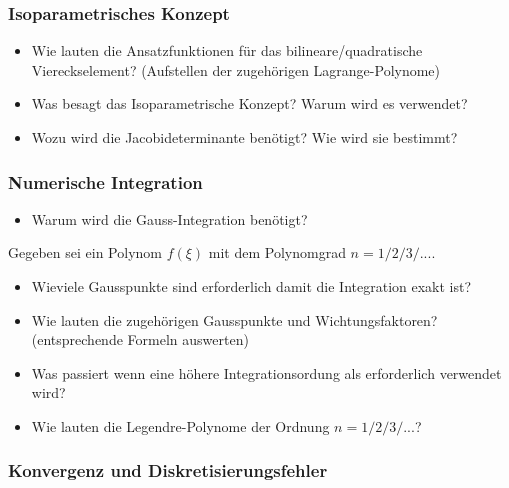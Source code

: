 \subsubsection*{Isoparametrisches Konzept}
\begin{itemize}
 \item Wie lauten die Ansatzfunktionen für das bilineare/quadratische Viereckselement? (Aufstellen der zugehörigen Lagrange-Polynome)
 \item Was besagt das Isoparametrische Konzept? Warum wird es verwendet?
 \item Wozu wird die Jacobideterminante benötigt? Wie wird sie bestimmt?
\end{itemize}



\subsubsection*{Numerische Integration}
\begin{itemize}
\item Warum wird die Gauss-Integration benötigt?
\end{itemize}


Gegeben sei ein Polynom $f(\xi)$ mit dem Polynomgrad $n=1/2/3/...$. 
\begin{itemize}
 \item Wieviele Gausspunkte sind erforderlich damit die Integration exakt ist?
 \item Wie lauten die zugehörigen Gausspunkte und Wichtungsfaktoren? (entsprechende Formeln auswerten)
 \item Was passiert wenn eine höhere Integrationsordung als erforderlich verwendet wird?
 \item Wie lauten die Legendre-Polynome der Ordnung $n=1/2/3/...$?
\end{itemize}

\subsubsection*{Konvergenz und Diskretisierungsfehler}

